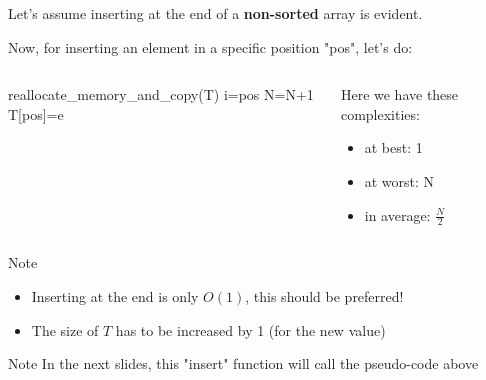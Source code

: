\documentclass{beamer}[10pt, usepdftitle=false, handout]
\begin{document}
	\begin{frame}
	
	Let's assume inserting at the end of a \textbf{non-sorted} array is evident.	 

	\vspace*{1em}	
	Now, for inserting an element in a specific position "pos", let's do:\
	\begin{columns}[c]
	\begin{center}    
    \scalebox{0.75} {
    \begin{algorithm}[H]
    reallocate\_memory\_and\_copy(T)\;
	i=pos\;
	N=N+1\;
	T[pos]=e\;
	\end{algorithm}
	}
	\end{center}	
	\begin{center}
	
	Here we have these complexities:
		
	\begin{itemize}
	\item {at best: 1}
	\item {at worst: N}
	\item {in average: $\frac{N}{2}$}	
	\end{itemize}		
	
	\end{center}
	\end{columns}	
	
	\pause
	
	\vspace*{1em}
	
	\begin{alertblock}{Note}
	\begin{itemize}
	\item {Inserting at the end is only $O(1)$, this should be preferred!}
	\item {The size of $T$ has to be increased by 1 (for the new value)}
	\end{itemize}
	\end{alertblock}		
	
	\begin{block}{Note}
	In the next slides, this "insert" function will call the pseudo-code above
	\end{block}
	
	\end{frame}
	
\end{document}
